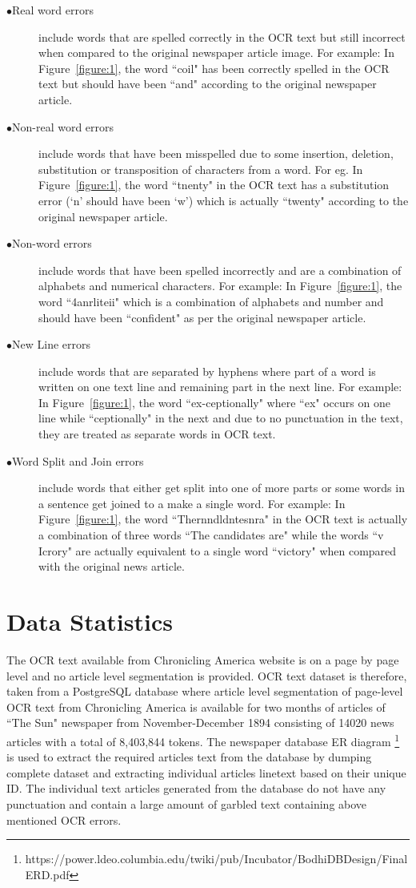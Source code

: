 \documentclass[letterpaper,11pt]{report}
\begin{document}
\begin{description}
 \item[$\bullet$Real word errors] include words that are spelled correctly in the OCR text but still incorrect when compared to the original newspaper article image. For example: In Figure~\ref{figure:1}, the word ``coil"  has been correctly spelled in the OCR text  but should have been ``and" according to the original newspaper article. 
 \item[$\bullet$Non-real word errors] include words that have been misspelled due to some insertion, deletion, substitution or transposition of characters from a word. For eg. In Figure~\ref{figure:1}, the word ``tnenty" in the OCR text has a substitution error (`n' should have been `w') which is actually ``twenty" according to the original newspaper article.
 \item[$\bullet$Non-word errors] include words that have been spelled incorrectly and are a combination of alphabets and numerical characters. For example: In Figure~\ref{figure:1}, the word ``4anrliteii" which is a combination of alphabets and number and should have been ``confident" as per the original newspaper article.
\item[$\bullet$New Line errors] include words that are separated by hyphens where part of a word is written on one text line and remaining part in the next line. For example: In Figure~\ref{figure:1}, the word ``ex-ceptionally" where ``ex" occurs on one line while ``ceptionally" in the next and due to no punctuation in the text, they are treated as separate words in OCR text.
\item[$\bullet$Word Split and Join errors] include words that either get split into one of more parts or some words in a sentence get joined to a make a single word. For example: In Figure~\ref{figure:1}, the word ``Thernndldntesnra" in the OCR text is actually a combination of three words ``The candidates are" while the words ``v Icrory" are actually equivalent to a single word ``victory" when compared with the original news article.
\end{description} 

\section{Data Statistics}
The OCR text available from Chronicling America website is on a page by page level and no article level segmentation is provided. OCR text dataset is therefore, taken from a PostgreSQL database where article level segmentation of page-level OCR text from Chronicling America is available for two months of articles of ``The Sun" newspaper from November-December 1894 consisting of 14020 news articles with a total of 8,403,844 tokens. The newspaper database ER diagram \footnote{https://power.ldeo.columbia.edu/twiki/pub/Incubator/BodhiDBDesign/Final ERD.pdf }
is used to extract the required articles text from the database by dumping complete dataset and extracting individual articles linetext based on their unique ID. The individual text articles generated from the database do not have any punctuation and contain a large amount of garbled text containing above mentioned OCR errors.
\end{document}
